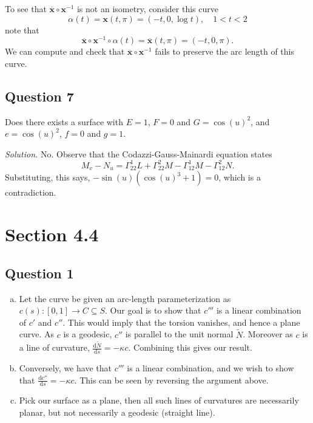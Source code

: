 \documentclass[12pt]{article}
\begin{document}
To see that \(\overline{\mathbf{x}} \circ \mathbf{x}^{-1}\) is not an isometry,
consider this curve
\[ \alpha(t) = \mathbf{x}(t,\pi) = (-t, 0, \log t),\quad 1<t<2 \]
note that
\[ \overline{\mathbf{x}} \circ \mathbf{x}^{-1} \circ \alpha(t) = \overline{\mathbf{x}}(t,\pi) = (-t, 0, \pi). \]
We can compute and check that \(\overline{\mathbf{x}} \circ \mathbf{x}^{-1}\) fails to preserve the arc length of this curve.


\subsection*{Question 7}

Does there exists a surface with $E = 1$, $F = 0$ and $G = \cos(u)^2$, and 
$e = \cos(u)^2$, $f = 0$ and $g = 1.$

\textit{Solution.} No. Observe that the Codazzi-Gauss-Mainardi equation states
$$M_v - N_u = \Gamma^1_{22}L + \Gamma^2_{22}M - \Gamma^1_{12}M - \Gamma^2_{12}N.$$
Substituting, this says, ${-\sin(u)(\cos(u)^3 + 1)} = 0$, which is a contradiction.


\section*{Section 4.4}
\subsection*{Question 1}

\begin{enumerate}[(a)]
    \item Let the curve be given an arc-length parameterization
 as $c(s): [0,1] \to C \subseteq S.$
Our goal is to show that $c'''$ is a linear 
combination of $c'$ and $c''$. This would imply that the torsion vanishes, and hence a plane curve.
As $c$ is a geodesic, $c''$ is parallel to the unit normal $\tilde{N}$. 
Moreover as $c$ is a line of curvature, $\frac{\mathrm d\tilde{N}}{\mathrm ds} = -\kappa c$. Combining this gives our result.

\item Conversely, we have that $c'''$ is a linear combination, and we wish to show
that $\frac{\mathrm dc''}{\mathrm ds} = -\kappa c.$ This can be seen by reversing the argument above.

\item Pick our surface as a plane, then all such lines of curvatures are necessarily planar, but not necessarily a geodesic (straight line).

\end{enumerate}
\end{document}
